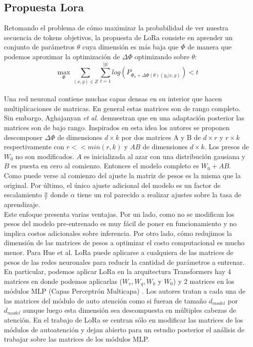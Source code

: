\documentclass[11pt,a4paper,twoside]{tesis}
\begin{document}
\subsection{Propuesta Lora}
Retomando el problema de cómo maximizar la probabilidad de ver nuestra secuencia de tokens objetivos, la propuesta de LoRa consiste en aprender un conjunto de parámetros $\theta$ cuya dimensión es más baja que $\Phi$ de manera que podemos aproximar la optimización de $\Delta \Phi$ optimizando sobre $\theta$:
$$\max_{\Phi} \sum_{(x,y)\in Z} \sum_{t=1}^{|y|} log (P_{\Phi_o+\Delta\Phi(\theta)(y_t|x,y)})<t$$ \\


%
Una red neuronal contiene muchas capas densas en su interior que hacen multiplicaciones de matricas. En general estas matrices son de rango completo. Sin embargo, Aghajanyan \textit{et al.} demuestran que en una adaptación posterior las matrices son de bajo rango. Inspirados en esta idea los autores se proponen descomponer $\Delta \Phi$ de dimensiones $d \times k$ por dos matrices A y B de $d \times r$ y $r\times k$ respectivamente con $r << min(r,k)$ y $AB$ de dimensiones $d\times k $. Los presos de $W_0$ no son modificados. $A$ es inicializada al azar con una distribución gausiana y $B$ es puesta en cero al comienzo. Entonces el modelo completo es $W_0 + AB$.  Como puede verse al comienzo del ajuste la matriz de pesos es la misma que la original. Por último, el único ajuste adicional del modelo es un factor de escalamiento $\frac{\alpha}{r}$ donde $\alpha$ tiene un rol parecido a realizar ajustes sobre la tasa de aprendizaje. \cite{hu2021lora} \\

Este enfoque presenta varias ventajas. Por un lado, como no se modifican los pesos del modelo pre-entrenado es muy fácil de poner en funcionamiento y no implica costos adicionales sobre inferencia. Por otro lado, cómo redujimos la dimensión de las matrices de pesos a optimizar el costo computacional es mucho menor.
Para Hue et al. LoRa puede aplicarse a cualquiera de las matrices de pesos de las redes neuronales para reducir la cantidad de parámetros a entrenar. En particular, podemos aplicar LoRa en la arquitectura Transformers hay 4 matrices en donde podemos aplicarlas ($W_v,W_q, W_k$  y $W_0$) y 2 matrices en los módulos MLP (Capas Perceptrón Multicapa) . Los autores tratan a cada una de las matrices del módulo de auto atención como si fueran de tamaño $d_{model}$ por $ d_{model}$ aunque luego esta dimensión sea descompuesta en múltiples cabezas de atención. En el trabajo de LoRa se centran sólo en modificar las matrices de los módulos de autoatención y dejan abierto para un estudio posterior el análisis de trabajar sobre las matrices de los módulos MLP.\\
\end{document}
